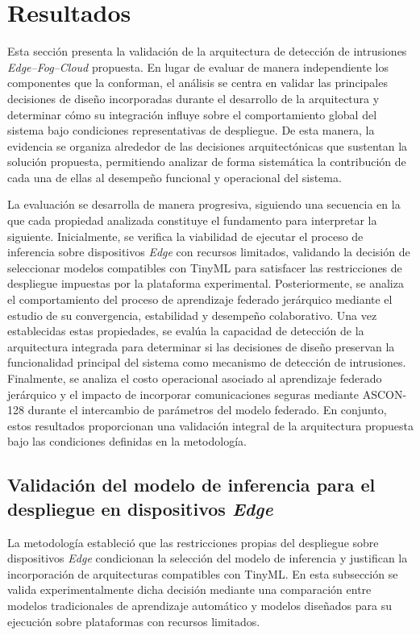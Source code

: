 \documentclass[journal,article,submit,moreauthors]{Definitions/mdpi}
\begin{document}
\section{Resultados}
\label{sec:results}
Esta sección presenta la validación de la arquitectura de detección de intrusiones \textit{Edge--Fog--Cloud} propuesta. En lugar de evaluar de manera independiente los componentes que la conforman, el análisis se centra en validar las principales decisiones de diseño incorporadas durante el desarrollo de la arquitectura y determinar cómo su integración influye sobre el comportamiento global del sistema bajo condiciones representativas de despliegue. De esta manera, la evidencia se organiza alrededor de las decisiones arquitectónicas que sustentan la solución propuesta, permitiendo analizar de forma sistemática la contribución de cada una de ellas al desempeño funcional y operacional del sistema.

La evaluación se desarrolla de manera progresiva, siguiendo una secuencia en la que cada propiedad analizada constituye el fundamento para interpretar la siguiente. Inicialmente, se verifica la viabilidad de ejecutar el proceso de inferencia sobre dispositivos \textit{Edge} con recursos limitados, validando la decisión de seleccionar modelos compatibles con TinyML para satisfacer las restricciones de despliegue impuestas por la plataforma experimental. Posteriormente, se analiza el comportamiento del proceso de aprendizaje federado jerárquico mediante el estudio de su convergencia, estabilidad y desempeño colaborativo. Una vez establecidas estas propiedades, se evalúa la capacidad de detección de la arquitectura integrada para determinar si las decisiones de diseño preservan la funcionalidad principal del sistema como mecanismo de detección de intrusiones. Finalmente, se analiza el costo operacional asociado al aprendizaje federado jerárquico y el impacto de incorporar comunicaciones seguras mediante ASCON-128 durante el intercambio de parámetros del modelo federado. En conjunto, estos resultados proporcionan una validación integral de la arquitectura propuesta bajo las condiciones definidas en la metodología.

\subsection{Validación del modelo de inferencia para el despliegue en dispositivos \textit{Edge}}
La metodología estableció que las restricciones propias del despliegue sobre dispositivos \textit{Edge} condicionan la selección del modelo de inferencia y justifican la incorporación de arquitecturas compatibles con TinyML. En esta subsección se valida experimentalmente dicha decisión mediante una comparación entre modelos tradicionales de aprendizaje automático y modelos diseñados para su ejecución sobre plataformas con recursos limitados.
\end{document}
